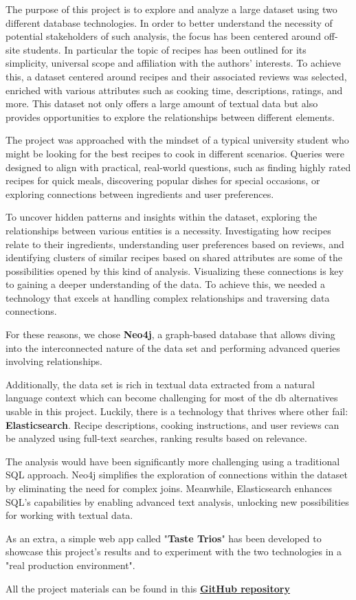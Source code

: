 The purpose of this project is to explore and analyze a large dataset using two different database technologies. 
In order to better understand the necessity of potential stakeholders of such analysis, the focus has been centered around off-site students. In particular the topic of recipes has been outlined for its simplicity, universal scope and affiliation with the authors' interests.
To achieve this, a dataset centered around recipes and their associated reviews was selected, enriched with various attributes such as cooking time, descriptions, ratings, and more. This dataset not only offers a large amount of textual data but also provides opportunities to explore the relationships between different elements.

The project was approached with the mindset of a typical university student who might be looking for the best recipes to cook in different scenarios. Queries were designed to align with practical, real-world questions, such as finding highly rated recipes for quick meals, discovering popular dishes for special occasions, or exploring connections between ingredients and user preferences.

To uncover hidden patterns and insights within the dataset, exploring the relationships between various entities is a necessity. Investigating how recipes relate to their ingredients, understanding user preferences based on reviews, and identifying clusters of similar recipes based on shared attributes are some of the possibilities opened by this kind of analysis. Visualizing these connections is key to gaining a deeper understanding of the data. To achieve this, we needed a technology that excels at handling complex relationships and traversing data connections.

For these reasons, we chose \textbf{Neo4j}, a graph-based database that allows diving into the interconnected nature of the data set and performing advanced queries involving relationships.

Additionally, the data set is rich in textual data extracted from a natural language context which can become challenging for most of the db alternatives usable in this project. Luckily, there is a technology that thrives where other fail: \textbf{Elasticsearch}.
Recipe descriptions, cooking instructions, and user reviews can be analyzed using full-text searches, ranking results based on relevance.

The analysis would have been significantly more challenging using a traditional SQL approach. Neo4j simplifies the exploration of connections within the dataset by eliminating the need for complex joins. Meanwhile, Elasticsearch enhances SQL's capabilities by enabling advanced text analysis, unlocking new possibilities for working with textual data.

As an extra, a simple web app called "\textbf{Taste Trios}" has been developed to showcase this project's results and to experiment with the two technologies in a "real production environment".

All the project materials can be found in this  \href{https://github.com/PaoloGinefra/SMBUD_project_24}{\textbf{GitHub repository}}